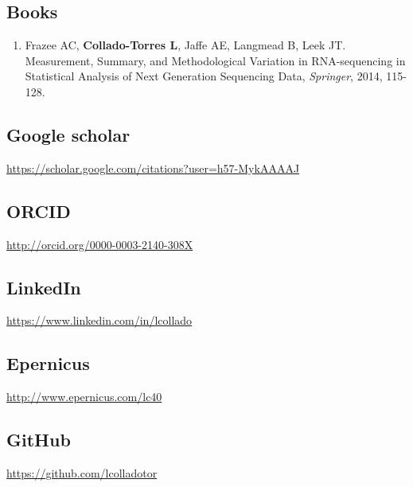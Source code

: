 \subsection{Books}
    \begin{enumerate}
        \item Frazee AC, \textbf{Collado-Torres L}, Jaffe AE, Langmead B, Leek JT. Measurement, Summary, and Methodological Variation in RNA-sequencing in Statistical Analysis of Next Generation Sequencing Data, \emph{Springer}, 2014, 115-128.
    \end{enumerate}
\subsection{Google scholar}
    \url{https://scholar.google.com/citations?user=h57-MykAAAAJ}
\subsection{ORCID}
    \url{http://orcid.org/0000-0003-2140-308X}
\subsection{LinkedIn}
    \url{https://www.linkedin.com/in/lcollado}
\subsection{Epernicus}
    \url{http://www.epernicus.com/lc40}
\subsection{GitHub}
    \url{https://github.com/lcolladotor}

